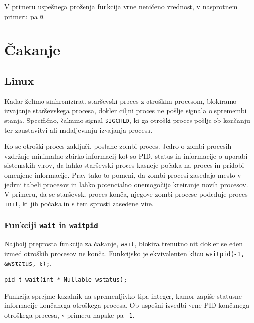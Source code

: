 \documentclass[a4paper,12pt,openright]{book}
\begin{document}
V primeru uspešnega proženja funkcija vrne neničeno vrednost, v nasprotnem primeru pa \texttt{0}.

\section{Čakanje}

\subsection{Linux} \label{ssec:linux_syscalls:waiting}

Kadar želimo sinhronizirati starševski proces z otroškim procesom, blokiramo izvajanje starševskega procesa, dokler ciljni proces ne pošlje signala o spremembi stanja.
Specifično, čakamo signal \texttt{SIGCHLD}, ki ga otroški proces pošlje ob končanju ter zaustavitvi ali nadaljevanju izvajanja procesa.

Ko se otroški proces zaključi, postane zombi proces.
Jedro o zombi procesih vzdržuje minimalno zbirko informacij kot so PID, status in informacije o uporabi sistemskih virov, da lahko starševski proces kasneje počaka na proces in pridobi omenjene informacije.
Prav tako to pomeni, da zombi procesi zasedajo mesto v jedrni tabeli procesov in lahko potencialno onemogočijo kreiranje novih procesov.
V primeru, da se starševski proces konča, njegove zombi procese podeduje proces \texttt{init}, ki jih počaka in s tem sprosti zasedene vire.

\subsubsection{Funkciji \texttt{wait} in \texttt{waitpid}}

Najbolj preprosta funkcija za čakanje, \texttt{wait}, blokira trenutno nit dokler se eden izmed otroških procesov ne konča.
Funkcijsko je ekvivalenten klicu \verb|waitpid(-1, &wstatus, 0);|.

\begin{lstlisting}[style=func]
 pid_t wait(int *_Nullable wstatus);
\end{lstlisting}

Funkcija sprejme kazalnik na spremenljivko tipa integer, kamor zapiše statusne informacije končanega otroškega procesa.
Ob uspešni izvedbi vrne PID končanega otroškega procesa, v primeru napake pa \texttt{-1}.
\end{document}
